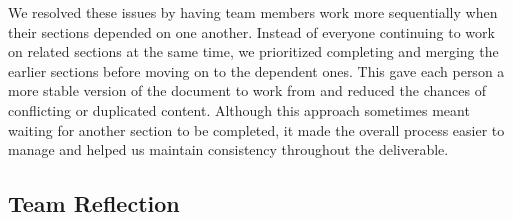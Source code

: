 \documentclass{article}
\begin{document}
\begin{enumerate}
    We resolved these issues by having team members work more
    sequentially when their sections depended on one another.
    Instead of everyone continuing to work on related sections
    at the same time, we prioritized completing and merging the
    earlier sections before moving on to the dependent ones.
    This gave each person a more stable version of the document
    to work from and reduced the chances of conflicting or
    duplicated content. Although this approach
    sometimes meant waiting for another section to be completed,
    it made the overall process easier to manage and helped us
    maintain consistency throughout the deliverable.
    
\end{enumerate}

\subsection*{Team Reflection}
\end{document}
